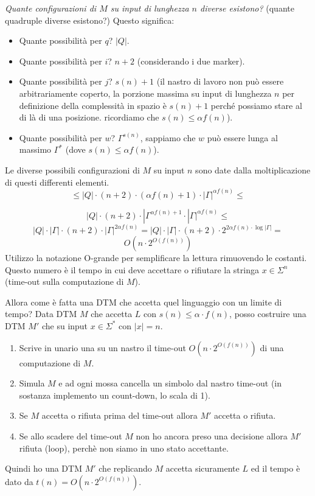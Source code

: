 \documentclass{article}
\begin{document}
\textit{Quante configurazioni di $M$ su input di lunghezza $n$ diverse esistono?} (quante
quadruple diverse esistono?) Questo significa:
\begin{itemize}
    \item Quante possibilità per $q$? $|Q|$.
    \item Quante possibilità per $i$? $n+2$ (considerando i due marker).
    \item Quante possibilità per $j$? $s(n)+1$ (il nastro di lavoro non può
          essere arbitrariamente coperto, la porzione massima su input di lunghezza $n$
          per definizione della complessità in spazio è $s(n)+1$ perché possiamo stare
          al di là di una posizione. ricordiamo che $s(n)\leq\alpha f(n)$).
    \item Quante possibilità per $w$? $\Gamma^{s(n)}$, sappiamo che $w$ può essere
          lunga al massimo $\Gamma^*$ (dove $s(n)\leq\alpha f(n)$).
\end{itemize}
Le diverse possibili configurazioni di $M$ su input $n$ sono date dalla moltiplicazione di questi
differenti elementi.
$$\leq |Q|\cdot(n+2)\cdot(\alpha f(n)+1)\cdot|\Gamma|^{\alpha f(n)}\leq$$

$$|Q|\cdot(n+2)\cdot|\Gamma^{\alpha f(n)+1}\cdot|\Gamma|^{\alpha f(n)}\leq$$
$$|Q|\cdot|\Gamma|\cdot(n+2)\cdot|\Gamma|^{2\alpha f(n)}=|Q|\cdot|\Gamma|\cdot(n+2)\cdot2^{2\alpha f(n)\cdot\log |\Gamma|}=$$
$$O(n\cdot 2^{O(f(n))})$$
Utilizzo la notazione O-grande per semplificare la lettura rimuovendo le costanti. Questo numero è
il tempo in cui deve accettare o rifiutare la stringa $x\in\Sigma^n$ (time-out sulla computazione di $M$).

Allora come è fatta una DTM che accetta quel linguaggio con un limite di tempo? Data DTM $M$ che accetta
$L$ con $s(n)\leq\alpha\cdot f(n)$, posso costruire una DTM $M'$ che su input $x\in\Sigma^*$ con $|x|=n$.
\begin{enumerate}
    \item Scrive in unario una su un nastro il time-out $O(n\cdot 2^{O(f(n))})$ di una computazione di $M$.
    \item Simula $M$ e ad ogni mossa cancella un simbolo dal nastro time-out (in
          sostanza implemento un count-down, lo scala di 1).
    \item Se $M$ accetta o rifiuta prima del time-out allora $M'$ accetta o rifiuta.
    \item Se allo scadere del time-out $M$ non ho ancora preso una decisione allora $M'$ rifiuta (loop),
          perchè non siamo in uno stato accettante.
\end{enumerate}
Quindi ho una DTM $M'$ che replicando $M$ accetta sicuramente $L$ ed il tempo è
dato da $t(n)=O(n\cdot 2^{O(f(n))})$.
\end{document}
